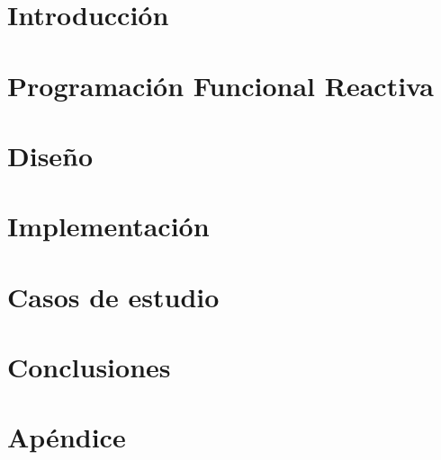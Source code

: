 \documentclass[12pt,a4paper,spanish]{book}
\begin{document}
\chapter{Introducción}


\chapter{Programación Funcional Reactiva}


\chapter{Diseño}


\chapter{Implementación}


\chapter{Casos de estudio}


\chapter{Conclusiones}



\cleardoublepage
{}

%






\appendix
\cleardoublepage
\addappheadtotoc
\appendixpage

\chapter{Apéndice}

%
%


\end{document}
